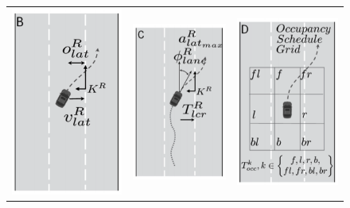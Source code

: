 \begin{figure}
\begin{center}
\begin{tabular}{ccc}
\includegraphics[scale=0.5]{./figures/DaimlerLEHipothesis} &

\includegraphics[scale=0.5]{./figures/DaimlerTRAJHipothesis} &

\includegraphics[scale=0.5]{./figures/DaimlerOCCGRIDHipothesis} \\


\end{tabular}
\end{center}
\end{figure}
